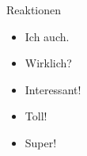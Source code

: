 \begin{pragmatics}{Reaktionen}{}
\begin{itemize}
	\item Ich auch.
	\item Wirklich?
	\item Interessant!
	\item Toll!
	\item Super!
\end{itemize}
\end{pragmatics}
